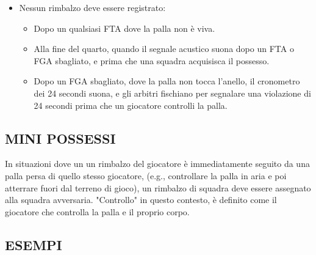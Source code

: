\begin{itemize}
    \item Nessun rimbalzo deve essere registrato:

        \begin{itemize}
            \item Dopo un qualsiasi FTA dove la palla non è viva.
            \item Alla fine del quarto, quando il segnale acustico suona dopo un FTA o FGA sbagliato, e prima che una squadra acquisisca il possesso.
            \item Dopo un FGA sbagliato, dove la palla non tocca l'anello, il cronometro dei 24 secondi suona, e gli arbitri fischiano per segnalare una violazione di 24 secondi prima che un giocatore controlli la palla.
        \end{itemize}
\end{itemize}


\subsection{MINI POSSESSI}
\subsectionline
In situazioni dove un un rimbalzo del giocatore è immediatamente seguito da una palla persa di quello stesso giocatore, (e.g., controllare la palla in aria e poi atterrare fuori dal terreno di gioco), un rimbalzo di squadra deve essere assegnato alla squadra avversaria. "Controllo" in questo contesto, è definito come il giocatore che controlla la palla e il proprio corpo.

\subsection{ESEMPI}
\subsectionline




